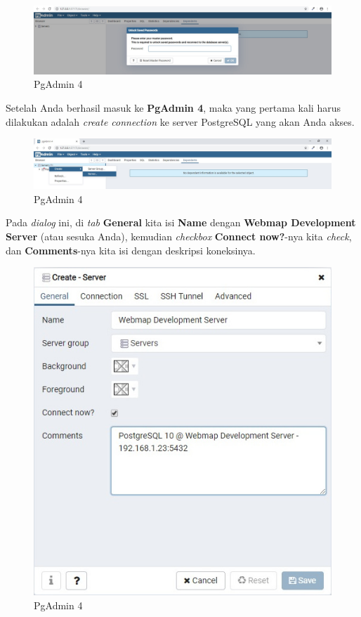 \documentclass[]{book}
\begin{document}
\begin{figure}
\centering
\includegraphics{./img/pgadmin4-master-password.jpg}
\caption{PgAdmin 4}
\end{figure}

Setelah Anda berhasil masuk ke \textbf{PgAdmin 4}, maka yang pertama kali harus dilakukan adalah \emph{create connection} ke server PostgreSQL yang akan Anda akses.

\begin{figure}
\centering
\includegraphics{./img/pgadmin4-create.jpg}
\caption{PgAdmin 4}
\end{figure}

Pada \emph{dialog} ini, di \emph{tab} \textbf{General} kita isi \textbf{Name} dengan \textbf{Webmap Development Server} (atau sesuka Anda), kemudian \emph{checkbox} \textbf{Connect now?}-nya kita \emph{check}, dan \textbf{Comments}-nya kita isi dengan deskripsi koneksinya.

\begin{figure}
\centering
\includegraphics{./img/pgadmin4-create-general.jpg}
\caption{PgAdmin 4}
\end{figure}
\end{document}
